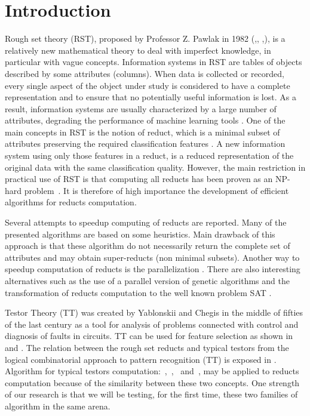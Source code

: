 \documentclass[11pt]{article}   %
\begin{document}
\section{Introduction}
  Rough set theory (RST), proposed by Professor Z. Pawlak in 1982 (\cite{Pawlak81},\cite{Pawlak81-2},
  \cite{Pawlak82},\cite{Pawlak91}), is a relatively new mathematical theory 
  to deal with imperfect knowledge, in particular with vague concepts. Information systems in RST 
  are tables of objects described by some attributes (columns). 
  When data is collected or recorded, every single aspect of the object under study is considered 
  to have a complete representation and to ensure that no potentially useful information is lost.
  As a result, information systems are usually characterized by a large number of attributes,
  degrading the performance of machine learning tools \cite{Parthalain08}.
  One of the main concepts in RST is the notion of reduct, which is a minimal subset of attributes 
  preserving the required classification features \cite{Pawlak91}. A new information system using 
  only those features in a reduct, is a reduced representation of the original data with the same 
  classification quality. 
  However, the main restriction in practical use of RST is that computing all reducts has been proven 
  as an NP-hard problem~\cite{Skowron92}.
  It is therefore of high importance the development of efficient algorithms for reducts computation.
  
  Several attempts to speedup computing of reducts are reported. Many of the presented algorithms are 
  based on some heuristics. Main drawback of this approach is that these algorithm do not necessarily 
  return the complete set of attributes and may obtain super-reducts (non minimal subsets). Another 
  way to speedup computation of reducts is the parallelization \cite{Strakowski08}. There are also 
  interesting alternatives such as the use of a parallel version of genetic algorithms \cite{Wroblewski98}
  and the transformation of reducts computation to the well known problem SAT \cite{Jensen14}.
  
  Testor Theory (TT) was created by Yablonskii and Chegis in the middle of fifties 
  of the last century as a tool for analysis of problems connected with control and 
  diagnosis of faults in circuits. TT can be used for feature selection as shown in~\cite{Ruiz08}
  and \cite{Martinez01}. The relation between the rough set reducts and typical testors from the
  logical combinatorial approach to pattern recognition (TT) is exposed in \cite{Lazo15}. Algorithm for
  typical testors computation:~\cite{Ruiz85},~\cite{Santiesteban03},~\cite{Sanchez07} and~\cite{Lias09},
  may be applied to reducts computation because of the similarity between these two concepts. One strength 
  of our research is that we will be testing, for the first time, these two families of algorithm in the 
  same arena.
  
\end{document}
